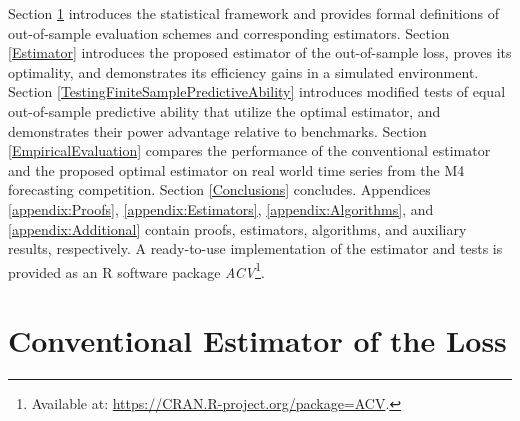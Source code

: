 \documentclass[11pt,dvipsnames]{article}
\begin{document}
Section \ref{ConventionalEstimator} introduces the statistical framework and provides formal definitions of out-of-sample evaluation schemes and corresponding estimators. Section \ref{Estimator} introduces the proposed estimator of the out-of-sample loss, proves its optimality, and demonstrates its efficiency gains in a simulated environment. Section \ref{TestingFiniteSamplePredictiveAbility} introduces modified tests of equal out-of-sample predictive ability that utilize the optimal estimator, and demonstrates their power advantage relative to benchmarks. Section \ref{EmpiricalEvaluation} compares the performance of the conventional estimator and the proposed optimal estimator on real world time series from the M4 forecasting competition. Section \ref{Conclusions} concludes. Appendices \ref{appendix:Proofs}, \ref{appendix:Estimators}, \ref{appendix:Algorithms}, and \ref{appendix:Additional} contain proofs, estimators, algorithms, and auxiliary results, respectively. A ready-to-use implementation of the estimator and tests is provided as an R software package \textit{ACV}\footnote{Available at: \url{https://CRAN.R-project.org/package=ACV}.}.

\section{Conventional Estimator of the Loss}\label{ConventionalEstimator}
\end{document}
